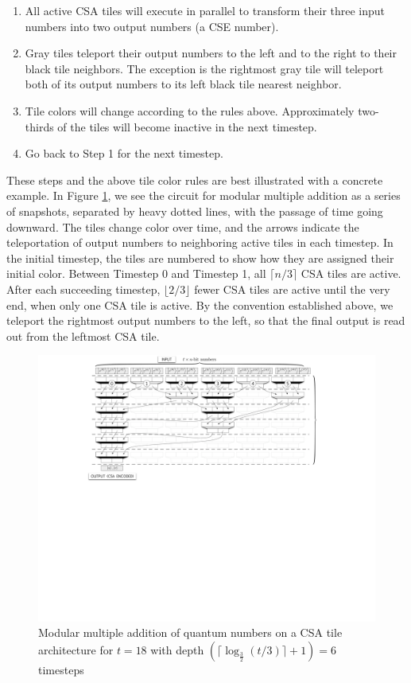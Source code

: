 \begin{enumerate}
\item
All active CSA tiles will execute in
parallel to transform their three input numbers into two output numbers
(a CSE number).
\item
Gray tiles teleport their output numbers to the left and to the right to
their black tile neighbors. The exception is the rightmost gray tile will
teleport both of its output numbers to its left black tile nearest neighbor.
\item
Tile colors will change according to the rules above. Approximately
two-thirds of the tiles will
become inactive in the next timestep.
\item
Go back to Step 1 for the next timestep.
\end{enumerate}

These steps and the above tile color rules are best illustrated with a concrete
example. In Figure \ref{fig:mod-mult}, we see the circuit for modular
multiple addition as a series of
snapshots, separated by heavy dotted lines, with the passage of time going
downward. The tiles change color over time, and the arrows indicate the
teleportation of output numbers to neighboring active tiles in each timestep.
In the initial timestep, the tiles are numbered to show how they are assigned
their initial color.
Between Timestep 0 and Timestep 1,
all $\lceil n/3 \rceil$ CSA tiles are active. After each succeeding timestep,
$\lfloor 2/3 \rfloor$
fewer CSA tiles are active until the very end, when only one CSA tile is
active. By the convention established above,
we teleport the rightmost output numbers to the left, so that the
final output is read out from the leftmost CSA tile.

\begin{figure}[htb!]
\centerline{
\includegraphics[width=5.5in]{figures/mod-mult-add.pdf}
}
\caption{Modular multiple addition of quantum numbers on a CSA tile
architecture for $t=18$ with depth $(\lceil \log_{\frac{3}{2}}(t/3) \rceil + 1) = 6$
timesteps}
\label{fig:mod-mult}
\end{figure}
%

